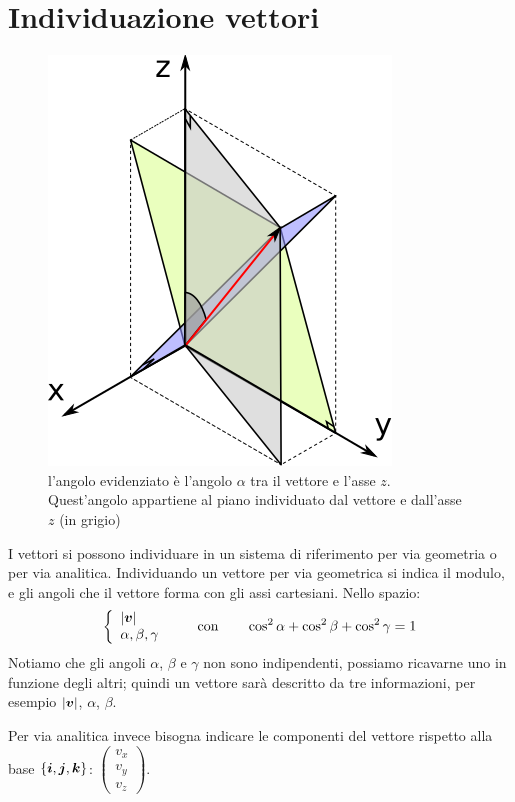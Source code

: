 \section{Individuazione vettori}
\begin{figure}[htbp]
 \centering
 \includegraphics{immagini/fisica1/vettore_geometrico}
 \caption{l'angolo evidenziato è l'angolo $\alpha$ tra il vettore e l'asse $z$. Quest'angolo appartiene al piano individuato dal vettore e dall'asse $z$ (in grigio)}
\end{figure}
I vettori si possono individuare in un sistema di riferimento per via geometria o per via analitica. Individuando un vettore per via geometrica si indica il modulo, e gli angoli che il vettore forma con gli assi cartesiani. Nello spazio:
\begin{equation*}
\left\{
\begin{array}{l}
|\boldsymbol{v}|\\
\alpha,\beta,\gamma
\end{array}\right. \qquad \text{con}\qquad \cos^2 \alpha+\cos^2 \beta + \cos^2
\gamma=1
\end{equation*}
Notiamo che gli angoli $\alpha$, $\beta$ e $\gamma$ non sono indipendenti, possiamo ricavarne uno in funzione degli altri; quindi un vettore sarà descritto da tre informazioni, per esempio $|\boldsymbol{v}|$, $\alpha$, $\beta$.

Per via analitica invece bisogna indicare le componenti del vettore rispetto alla base $\{\boldsymbol{i}, \boldsymbol{j}, \boldsymbol{k}\}$: $\left(
\begin{array}{l}
v_x\\v_y\\v_z
\end{array}\right)
$.
